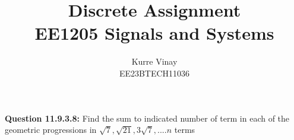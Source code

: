 \documentclass[a4,12pt,onecolumn]{IEEEtran}
\DeclareMathOperator*{\Res}{Res}
\begin{document}
\newtheorem{theorem}{Theorem}[section]
\newtheorem{problem}{Problem}
\newtheorem{proposition}{Proposition}[section]
\newtheorem{lemma}{Lemma}[section]
\newtheorem{corollary}[theorem]{Corollary}
\newtheorem{example}{Example}[section]
\newtheorem{definition}[problem]{Definition}
\newcommand{\BEQA}{\begin{eqnarray}}
\newcommand{\EEQA}{\end{eqnarray}}
\newcommand{\define}{\stackrel{\triangle}{=}}

\providecommand{\mbf}{\mathbf}
\providecommand{\pr}[1]{\ensuremath{\Pr\left(#1\right)}}
\providecommand{\qfunc}[1]{\ensuremath{Q\left(#1\right)}}
\providecommand{\sbrak}[1]{\ensuremath{{}\left[#1\right]}}
\providecommand{\lsbrak}[1]{\ensuremath{{}\left[#1\right.}}
\providecommand{\rsbrak}[1]{\ensuremath{{}\left.#1\right]}}
\providecommand{\brak}[1]{\ensuremath{\left(#1\right)}}
\providecommand{\lbrak}[1]{\ensuremath{\left(#1\right.}}
\providecommand{\rbrak}[1]{\ensuremath{\left.#1\right)}}
\providecommand{\cbrak}[1]{\ensuremath{\left\{#1\right\}}}
\providecommand{\lcbrak}[1]{\ensuremath{\left\{#1\right.}}
\providecommand{\rcbrak}[1]{\ensuremath{\left.#1\right\}}}
\theoremstyle{remark}
\newtheorem{rem}{Remark}
\newcommand{\sgn}{\mathop{\mathrm{sgn}}}
\providecommand{\res}[1]{\Res\displaylimits_{#1}} 
\providecommand{\mtx}[1]{\mathbf{#1}}
\providecommand{\fourier}{\overset{\mathcal{F}}{ \rightleftharpoons}}
\providecommand{\system}{\overset{\mathcal{H}}{ \longleftrightarrow}}
\newcommand{\solution}{\noindent \textbf{Solution: }}
\newcommand{\cosec}{\,\text{cosec}\,}
\providecommand{\dec}[2]{\ensuremath{\overset{#1}{\underset{#2}{\gtrless}}}}
\newcommand{\myvec}[1]{\ensuremath{\begin{pmatrix}#1\end{pmatrix}}}
\newcommand{\mydet}[1]{\ensuremath{\begin{vmatrix}#1\end{vmatrix}}}
\let\vec\mathbf
\title{
\Huge\textbf{Discrete Assignment}\\
\Huge\textbf{EE1205} Signals and Systems\\
}
\large\author{Kurre Vinay\\EE23BTECH11036}
\maketitle
\bigskip
\renewcommand{\thefigure}{\theenumi}
\renewcommand{\thetable}{\theenumi}
\textbf{Question 11.9.3.8:}
Find the sum to indicated number of term in each of the geometric progressions in $\sqrt{7} ,\sqrt{21} , 3\sqrt{7}, ....n$ terms\\
\end{document}
